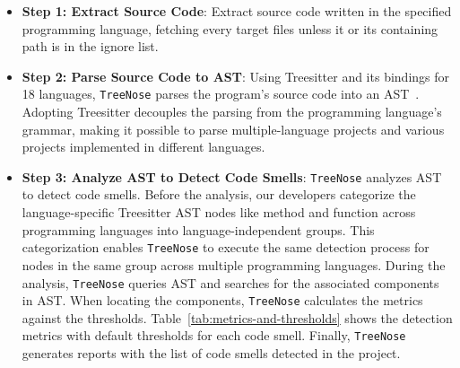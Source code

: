 \begin{itemize}[leftmargin=*]
    \item \textbf{Step 1: Extract Source Code}: Extract source code written in
        the specified programming language, fetching every target files unless
        it or its containing path is in the ignore list.
    \item \textbf{Step 2: Parse Source Code to AST}: Using Treesitter and its
        bindings for 18 languages, \texttt{TreeNose} parses the program's source
        code into an AST~\cite{treeSitter}. Adopting Treesitter decouples the
        parsing from the programming language's grammar, making it possible to
        parse multiple-language projects and various projects implemented in
        different languages.
    \item \textbf{Step 3: Analyze AST to Detect Code Smells}: \texttt{TreeNose}
        analyzes AST to detect code smells. Before the analysis, our developers
        categorize the language-specific Treesitter AST nodes like method and
        function across programming languages into language-independent groups.
        This categorization enables \texttt{TreeNose} to execute the same
        detection process for nodes in the same group across multiple
        programming languages. During the analysis, \texttt{TreeNose} queries
        AST and searches for the associated components in AST. When locating the
        components, \texttt{TreeNose} calculates the metrics against the
        thresholds. Table~\ref{tab:metrics-and-thresholds} shows the detection
        metrics with default thresholds for each code smell. Finally,
        \texttt{TreeNose} generates reports with the list of code smells
        detected in the project.
\end{itemize}


